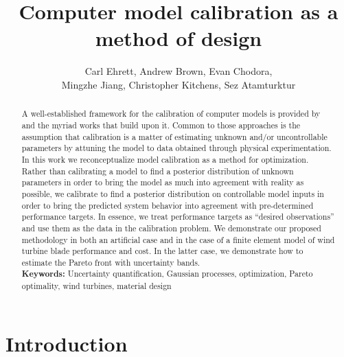 \documentclass{article}
\author{Carl Ehrett, Andrew Brown, Evan Chodora, \\Mingzhe Jiang, Christopher Kitchens, Sez Atamturktur}
\title{Computer model calibration as a method of design}
\begin{document}
\maketitle

\begin{abstract}
A well-established framework for the calibration of computer models is provided by \cite{Kennedy2001} and the myriad works that build upon it. 
%
Common to those approaches is the assumption that calibration is a matter of estimating unknown and/or uncontrollable parameters by attuning the model to data obtained through physical experimentation. 
%
In this work we reconceptualize model calibration as a method for optimization. 
%
Rather than calibrating a model to find a posterior distribution of unknown parameters in order to bring the model as much into agreement with reality as possible, we calibrate to find a posterior distribution on controllable model inputs in order to bring the predicted system behavior into agreement with pre-determined performance targets. 
%
In essence, we treat performance targets as ``desired observations'' and use them as the data in the calibration problem. 
%
We demonstrate our proposed methodology in both an artificial case and in the case of a finite element model of wind turbine blade performance and cost. 
%
In the latter case, we demonstrate how to estimate the Pareto front with uncertainty bands.\\

{{\bf Keywords:} Uncertainty quantification, Gaussian processes, optimization, Pareto optimality, wind turbines, material design}
\end{abstract}

\section{Introduction} \label{introduction}


\end{document}

